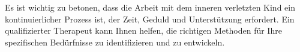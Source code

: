 %
Es ist wichtig zu betonen, dass die Arbeit mit dem inneren verletzten Kind ein kontinuierlicher Prozess ist, der Zeit, Geduld und Unterstützung erfordert. Ein qualifizierter Therapeut kann Ihnen helfen, die richtigen Methoden für Ihre spezifischen Bedürfnisse zu identifizieren und zu entwickeln.



